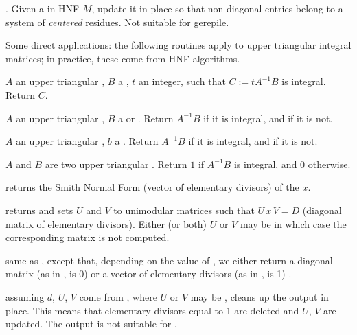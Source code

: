 . Given a  in HNF $M$, update it in
place so that non-diagonal entries belong to a system of \emph{centered}
residues. Not suitable for gerepile.

Some direct applications: the following routines apply to upper triangular
integral matrices; in practice, these come from HNF algorithms.

 $A$ an upper triangular ,
$B$ a , $t$ an integer, such that $C := tA^{-1}B$ is integral.
Return $C$.

 $A$ an upper triangular ,
$B$ a  or . Return $A^{-1}B$ if it is integral, and 
if it is not.

 $A$ an upper triangular ,
$b$ a .  Return $A^{-1}B$ if it is integral, and  if it is
not.

 $A$ and $B$ are two upper triangular
. Return $1$ if $A^{-1} B$ is integral, and $0$ otherwise.


 returns the Smith Normal Form (vector of
elementary divisors) of the  $x$.

 returns
 and sets $U$ and $V$ to unimodular matrices such that $U\,
x\, V = D$ (diagonal matrix of elementary divisors). Either (or both) $U$ or
$V$ may be  in which case the corresponding matrix is not computed.

 same as
, except that, depending on the value of , we
either return a diagonal matrix (as in ,  is 0)
or a vector of elementary divisors (as in ,  is 1) .

 assuming $d$, $U$, $V$ come
from , where $U$ or $V$ may be ,
cleans up the output in place. This means that elementary divisors equal to 1
are deleted and $U$, $V$ are updated. The output is not suitable for
.

